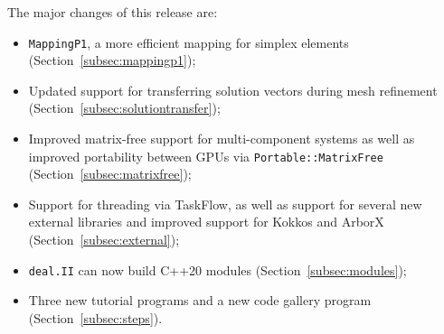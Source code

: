 \documentclass{ansarticle-preprint}
\newcommand{\specialword}[1]{\texttt{#1}}
\newcommand{\dealii}{{\specialword{deal.II}}\xspace}
\begin{document}
The major changes of this release are:
%
\begin{itemize}
\item \texttt{MappingP1}, a more efficient mapping for simplex elements
  (Section~\ref{subsec:mappingp1});

\item Updated support for transferring solution vectors during mesh refinement
  (Section~\ref{subsec:solutiontransfer});

\item Improved matrix-free support for multi-component systems as well as
  improved portability between GPUs via \texttt{Portable::MatrixFree}
  (Section~\ref{subsec:matrixfree});

\item Support for threading via TaskFlow, as well as support for
  several new external libraries and improved support for Kokkos and ArborX
  (Section~\ref{subsec:external});

\item \dealii{} can now build C++20 modules (Section~\ref{subsec:modules});

\item Three new tutorial programs and a new code gallery program
  (Section~\ref{subsec:steps}).
\end{itemize}
%
\end{document}
